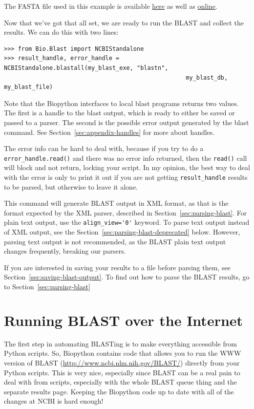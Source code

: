 \documentclass{report}
\begin{document}
The FASTA file used in this example is available
\href{examples/m\_cold.fasta}{here} as well as
\href{http://biopython.org/DIST/docs/tutorial/examples/m\_cold.fasta}{online}.

Now that we've got that all set, we are ready to run the BLAST and collect the results. We can do this with two lines:

\begin{verbatim}
>>> from Bio.Blast import NCBIStandalone
>>> result_handle, error_handle = NCBIStandalone.blastall(my_blast_exe, "blastn",
                                                    my_blast_db, my_blast_file)
\end{verbatim}

Note that the Biopython interfaces to local blast programs returns two values. The first is a handle to the blast output, which is ready to either be saved or passed to a parser. The second is the possible error output generated by the blast command. See Section~\ref{sec:appendix-handles} for more about handles.

The error info can be hard to deal with, because if you try to do a \verb|error_handle.read()| and there was no error info returned, then the \verb|read()| call will block and not return, locking your script. In my opinion, the best way to deal with the error is only to print it out if you are not getting \verb|result_handle| results to be parsed, but otherwise to leave it alone.

This command will generate BLAST output in XML format, as that is the format expected by the XML parser, described in Section~\ref{sec:parsing-blast}. For plain text output, use the \verb|align_view='0'| keyword. To parse text output instead of XML output, see the Section~\ref{sec:parsing-blast-deprecated} below. However, parsing text output is not recommended, as the BLAST plain text output changes frequently, breaking our parsers.

If you are interested in saving your results to a file before parsing them,
see Section~\ref{sec:saving-blast-output}. To find out how to parse the BLAST
results, go to Section~\ref{sec:parsing-blast}

\section{Running BLAST over the Internet}
\label{sec:running-www-blast}

The first step in automating BLASTing is to make everything accessible
from Python scripts. So, Biopython contains code that allows you to
run the WWW version of BLAST
(\url{http://www.ncbi.nlm.nih.gov/BLAST/}) directly from
your Python scripts. This is very nice, especially since BLAST can be
a real pain to deal with from scripts, especially with the whole BLAST
queue thing and the separate results page. Keeping the Biopython code
up to date with all of the changes at NCBI is hard enough!
\end{document}
